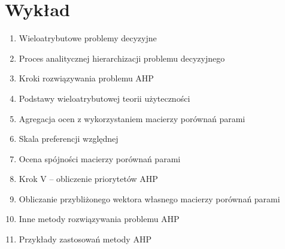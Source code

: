 \documentclass[11pt]{article}
\begin{document}
    \section{Wykład}
    \begin{enumerate}
        \item Wieloatrybutowe problemy decyzyjne
        \item Proces analitycznej hierarchizacji problemu decyzyjnego
        \item Kroki rozwiązywania problemu AHP
        \item Podstawy wieloatrybutowej teorii użyteczności
        \item Agregacja ocen z wykorzystaniem macierzy porównań parami
        \item Skala preferencji względnej
        \item Ocena spójności macierzy porównań parami
        \item Krok V – obliczenie priorytetów AHP
        \item Obliczanie przybliżonego wektora własnego macierzy porównań parami
        \item Inne metody rozwiązywania problemu AHP
        \item Przykłady zastosowań metody AHP
    \end{enumerate}
\end{document}
